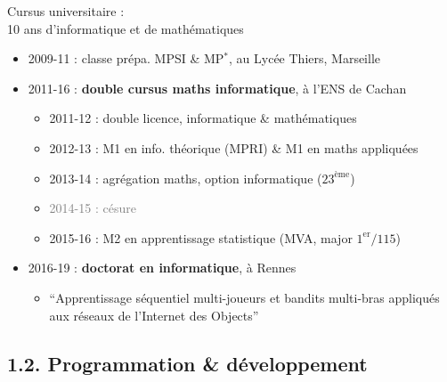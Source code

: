 \documentclass[11pt,english,ignorenonframetext,]{beamer}
\providecommand{\tightlist}{%
  \setlength{\itemsep}{0pt}\setlength{\parskip}{0pt}}
\begin{document}
\begin{frame}{Cursus universitaire :\\
  10 ans d'\textcolor{info}{informatique} et de \textcolor{maths}{mathématiques}}

\pause

\begin{itemize}
\tightlist
\item
  2009-11 : classe prépa. \textcolor{maths}{M}PSI \& \textcolor{maths}{M}P\(^*\), au Lycée Thiers, Marseille

\vspace*{10pt}
\pause
\item
  2011-16 : \textbf{double cursus \textcolor{maths}{maths} \textcolor{info}{informatique}}, à l'ENS de Cachan

  \begin{itemize}[<+->]
  \tightlist
  \item
    2011-12 : double licence, \textcolor{info}{informatique} \& \textcolor{maths}{mathématiques}
  \item
    2012-13 : M1 en \textcolor{info}{info. théorique} (MPRI) \& M1 en \textcolor{maths}{maths appliquées}
  \item
    2013-14 : \textcolor{maths}{agrégation maths}, \textcolor{info}{option informatique} ($23^{\text{ème}}$)
  \item
    \textcolor{gray}{2014-15 : césure}
  \item
    2015-16 : M2 en \textcolor{ml}{apprentissage statistique} (MVA, major $1^{\text{er}}/115$)
  \end{itemize}

\pause
\vspace*{10pt}
  \item
  2016-19 : \textbf{doctorat en \textcolor{info}{informatique}}, à Rennes

  \begin{itemize}
  \tightlist
  \item
    ``\textcolor{ml}{Apprentissage séquentiel} multi-joueurs et bandits multi-bras
    appliqués aux réseaux de l'Internet des Objects''
  \end{itemize}
\end{itemize}

\end{frame}


\subsection{\hfill{}1.2. Programmation \& développement\hfill{}}
\end{document}
